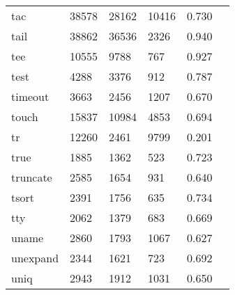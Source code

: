 \begin{longtable}{lp{2.4cm}p{2.4cm}p{2.4cm}p{2.4cm}p{2.4cm}}
tac       &                                   38578 &                       28162 &                        10416 &                                   0.730 \\
tail      &                                   38862 &                       36536 &                         2326 &                                   0.940 \\
tee       &                                   10555 &                        9788 &                          767 &                                   0.927 \\
test      &                                    4288 &                        3376 &                          912 &                                   0.787 \\
timeout   &                                    3663 &                        2456 &                         1207 &                                   0.670 \\
touch     &                                   15837 &                       10984 &                         4853 &                                   0.694 \\
tr        &                                   12260 &                        2461 &                         9799 &                                   0.201 \\
true      &                                    1885 &                        1362 &                          523 &                                   0.723 \\
truncate  &                                    2585 &                        1654 &                          931 &                                   0.640 \\
tsort     &                                    2391 &                        1756 &                          635 &                                   0.734 \\
tty       &                                    2062 &                        1379 &                          683 &                                   0.669 \\
uname     &                                    2860 &                        1793 &                         1067 &                                   0.627 \\
unexpand  &                                    2344 &                        1621 &                          723 &                                   0.692 \\
uniq      &                                    2943 &                        1912 &                         1031 &                                   0.650 \\

\end{longtable}
